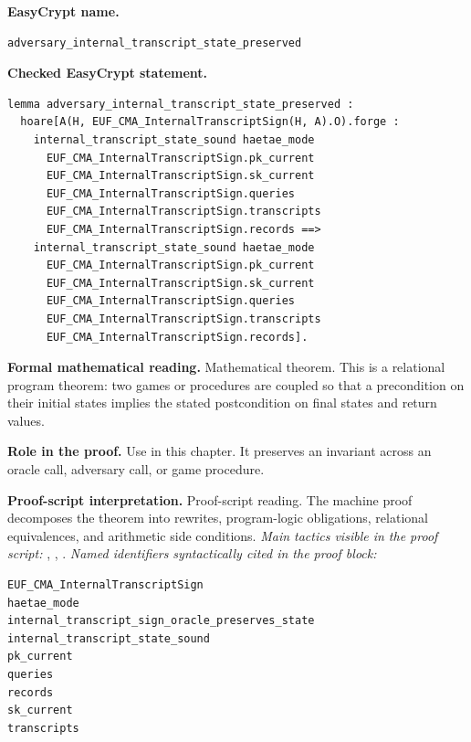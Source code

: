 \begin{formaltheorem}
\noindent\textbf{EasyCrypt name.}
\begin{lstlisting}[language=EasyCrypt,basicstyle=\ttfamily\scriptsize]
adversary_internal_transcript_state_preserved
\end{lstlisting}
\noindent\textbf{Checked EasyCrypt statement.}
\begin{lstlisting}[language=EasyCrypt,basicstyle=\ttfamily\scriptsize]
lemma adversary_internal_transcript_state_preserved :
  hoare[A(H, EUF_CMA_InternalTranscriptSign(H, A).O).forge :
    internal_transcript_state_sound haetae_mode
      EUF_CMA_InternalTranscriptSign.pk_current
      EUF_CMA_InternalTranscriptSign.sk_current
      EUF_CMA_InternalTranscriptSign.queries
      EUF_CMA_InternalTranscriptSign.transcripts
      EUF_CMA_InternalTranscriptSign.records ==>
    internal_transcript_state_sound haetae_mode
      EUF_CMA_InternalTranscriptSign.pk_current
      EUF_CMA_InternalTranscriptSign.sk_current
      EUF_CMA_InternalTranscriptSign.queries
      EUF_CMA_InternalTranscriptSign.transcripts
      EUF_CMA_InternalTranscriptSign.records].
\end{lstlisting}
\noindent\textbf{Formal mathematical reading.}
Mathematical theorem. This is a relational program theorem: two games or procedures are coupled so that a precondition on their initial states implies the stated postcondition on final states and return values.

\noindent\textbf{Role in the proof.}
Use in this chapter. It preserves an invariant across an oracle call, adversary call, or game procedure.

\noindent\textbf{Proof-script interpretation.}
Proof-script reading. The machine proof decomposes the theorem into rewrites, program-logic obligations, relational equivalences, and arithmetic side conditions.
\emph{Main tactics visible in the proof script:} , , .
\emph{Named identifiers syntactically cited in the proof block:}
\begin{lstlisting}[language=EasyCrypt,basicstyle=\ttfamily\scriptsize]
EUF_CMA_InternalTranscriptSign
haetae_mode
internal_transcript_sign_oracle_preserves_state
internal_transcript_state_sound
pk_current
queries
records
sk_current
transcripts
\end{lstlisting}

\end{formaltheorem}

